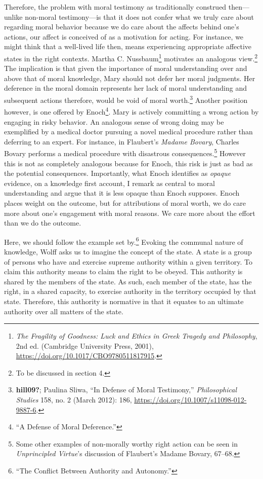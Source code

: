 \documentclass[
  12pt,
]{book}
\theoremstyle{definition}
\theoremstyle{definition}
\theoremstyle{definition}
\theoremstyle{definition}
\theoremstyle{remark}
\begin{document}
Therefore, the problem with moral testimony as traditionally construed then---unlike non-moral testimony---is that it does not confer what we truly care about regarding moral behavior because we do care about the affects behind one's actions, our affect is conceived of as a motivation for acting. For instance, we might think that a well-lived life then, means experiencing appropriate affective states in the right contexts. Martha C. Nussbaum\footnote{\emph{The {Fragility} of {Goodness}: {Luck} and {Ethics} in {Greek Tragedy} and {Philosophy}}, 2nd ed. (Cambridge University Press, 2001), \url{https://doi.org/10.1017/CBO9780511817915}.} motivates an analogous view.\footnote{To be discussed in section 4.} The implication is that given the importance of moral understanding over and above that of moral knowledge, Mary should not defer her moral judgments. Her deference in the moral domain represents her lack of moral understanding and subsequent actions therefore, would be void of moral worth.\footnote{\textbf{hill09?}; Paulina Sliwa, {``In Defense of Moral Testimony,''} \emph{Philosophical Studies} 158, no. 2 (March 2012): 186, \url{https://doi.org/10.1007/s11098-012-9887-6}.} Another position however, is one offered by Enoch\footnote{{``A {Defense} of {Moral Deference}.''}}. Mary is actively committing a wrong action by engaging in risky behavior. An analogous sense of wrong doing may be exemplified by a medical doctor pursuing a novel medical procedure rather than deferring to an expert. For instance, in Flaubert's \emph{Madame Bovary}, Charles Bovary performs a medical procedure with disastrous consequences.\footnote{ Some other examples of non-morally worthy right action can be seen in \emph{Unprincipled {Virtue}}'s discussion of Flaubert's Madame Bovary, 67--68.} However this is not as completely analogous because for Enoch, this risk is just as bad as the potential consequences. Importantly, what Enoch identifies as \emph{opaque} evidence, on a knowledge first account, I remark as central to moral understanding and argue that it is less opaque than Enoch supposes. Enoch places weight on the outcome, but for attributions of moral worth, we do care more about one's engagement with moral reasons. We care more about the effort than we do the outcome.

Here, we should follow the example set by.\footnote{{``The {Conflict Between Authority} and {Autonomy}.''}} Evoking the communal nature of knowledge, Wolff asks us to imagine the concept of the state. A state is a group of persons who have and exercise supreme authority within a given territory. To claim this authority means to claim the right to be obeyed. This authority is shared by the members of the state. As such, each member of the state, has the right, in a shared capacity, to exercise authority in the territory occupied by that state. Therefore, this authority is normative in that it equates to an ultimate authority over all matters of the state.
\end{document}
